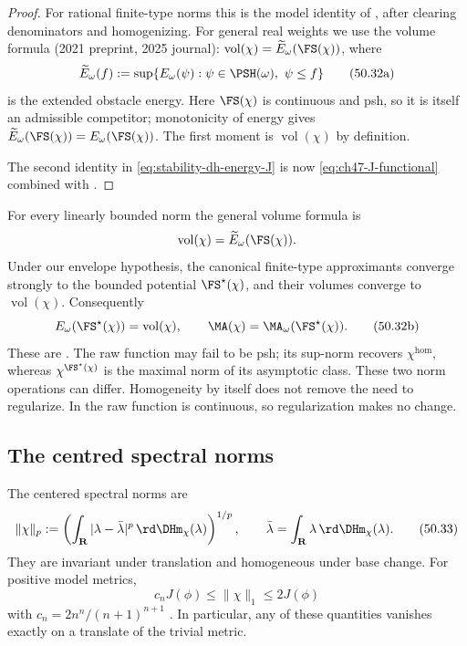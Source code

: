 \begin{proof}
For rational finite-type norms this is the model identity of
, after clearing denominators and homogenizing.
For general real weights we use the volume formula
\cite[Theorem~5.1]{BJKS1} (2021 preprint, 2025 journal):
$\operatorname{vol}(\chi)=\widetilde E_\omega(\FS(\chi))$, where
\[
 \widetilde E_\omega(f):=\sup\{E_\omega(\psi):
             \psi\in\PSH(\omega),\ \psi\le f\}
\tag{50.32a}\label{eq:ch50-obstacle-energy}
\]
is the extended obstacle energy.  Here $\FS(\chi)$ is continuous and
psh, so it is itself an admissible competitor; monotonicity of energy
gives $\widetilde E_\omega(\FS(\chi))=E_\omega(\FS(\chi))$.
The first moment is $\operatorname{vol}(\chi)$ by definition.

The second identity in \eqref{eq:stability-dh-energy-J} is now
\eqref{eq:ch47-J-functional} combined with
.
\end{proof}

\begin{remark}
\label{rem:ch50-energy-beyond-finite-type}
For every linearly bounded norm the general volume formula is
\[
 \operatorname{vol}(\chi)=\widetilde E_\omega(\FS(\chi)).
\]
Under our envelope hypothesis, the canonical finite-type approximants
converge strongly to the bounded potential $\FS^\star(\chi)$, and
their volumes converge to $\operatorname{vol}(\chi)$.  Consequently
\[
 E_\omega(\FS^\star(\chi))=\operatorname{vol}(\chi),\qquad
 \MA(\chi)=\MA_\omega(\FS^\star(\chi)).
\tag{50.32b}\label{eq:ch50-general-energy-ma}
\]
These are \cite[Theorem~5.1, Lemma~6.17, Theorems~6.29 and~7.2]{BJKS1}.
The raw function may fail to be psh; its sup-norm recovers $\chi^{\hom}$,
whereas $\chi^{\FS^\star(\chi)}$ is the maximal norm of its asymptotic
class.  These two norm operations can differ.  Homogeneity by itself does
not remove the need to regularize.  In  the raw
function is continuous, so regularization makes no change.
\end{remark}

\subsection{The centred spectral norms}
\label{sec:ch50-spectral-norms}

The centered spectral norms are
\[
 \|\chi\|_p
 :=\left(\int_{\mathbf R}|\lambda-\bar\lambda|^p
                    \,\rd \DHm_\chi(\lambda)\right)^{1/p},
\qquad
 \bar\lambda=\int_{\mathbf R}\lambda\,\rd \DHm_\chi(\lambda).
\tag{50.33}\label{eq:stability-spectral-lp}
\]
They are invariant under translation and homogeneous under base change.
For positive model metrics,
\[
        c_nJ(\phi)\leq\|\chi\|_1\leq2J(\phi)
\tag{50.34}\label{eq:stability-J-L1-comparison}
\]
with $c_n=2n^n/(n+1)^{n+1}$
\cite[Theorem~7.9]{BHJ17}.  In particular, any of these quantities
vanishes exactly on a translate of the trivial metric.

